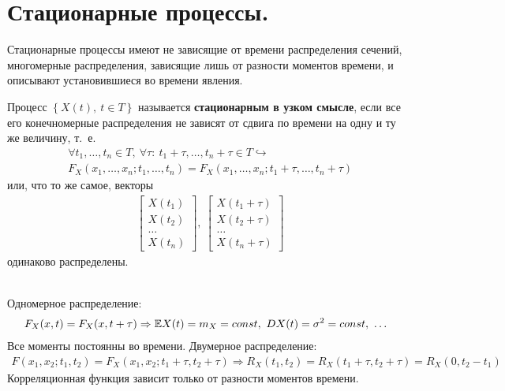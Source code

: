\section{Стационарные процессы.}
Стационарные процессы имеют не зависящие от времени распределения сечений,
многомерные распределения, зависящие лишь от разности моментов времени, и
описывают установившиеся во времени явления.
\begin{Def}
    Процесс $\left\{ X(t), \ t \in T \right\}$ называется \textbf{стационарным в
      узком смысле}, если все его конечномерные распределения не зависят от сдвига
    по времени на одну и ту же величину, т.~е.
    \begin{align*}
      & \forall t_1, \dots, t_n \in T, \ \forall \tau: \ t_1+\tau, \dots, t_n + \tau \in T \hookrightarrow \\
      & F_X(x_1, \dots, x_n; t_1, \dots, t_n) = F_X(x_1, \dots, x_n; t_1 + \tau, \dots, t_n+\tau)
    \end{align*}
    или, что то же самое, векторы
    \begin{align*}
      & \left[ \begin{matrix}
              X(t_1) \\
              X(t_2) \\
              \dots \\
              X(t_n)
          \end{matrix} \right], \  \left[ \begin{matrix}
              X(t_1+\tau) \\
              X(t_2+\tau) \\
              \dots \\
              X(t_n+\tau)
          \end{matrix} \right]
    \end{align*}
    одинаково распределены.
\end{Def}
\begin{example}
    ~
    \\
    Одномерное распределение:
    \begin{align*}
      F_X(x,t) = F_X(x, t + \tau) \Rightarrow \EE X(t) = m_X = const , \ D X(t) = \sigma^2 = const, \ \dots
    \end{align*}
    Все моменты постоянны во времени.
    Двумерное распределение:
    \begin{align*}
      F(x_1,x_2; t_1, t_2) = F_X(x_1, x_2; t_1 + \tau, t_2 + \tau) \Rightarrow R_X(t_1,t_2) = R_X(t_1+\tau, t_2+\tau) = R_X(0, t_2-t_1)
    \end{align*}
    Корреляционная функция зависит только от разности моментов времени.
\end{example}
